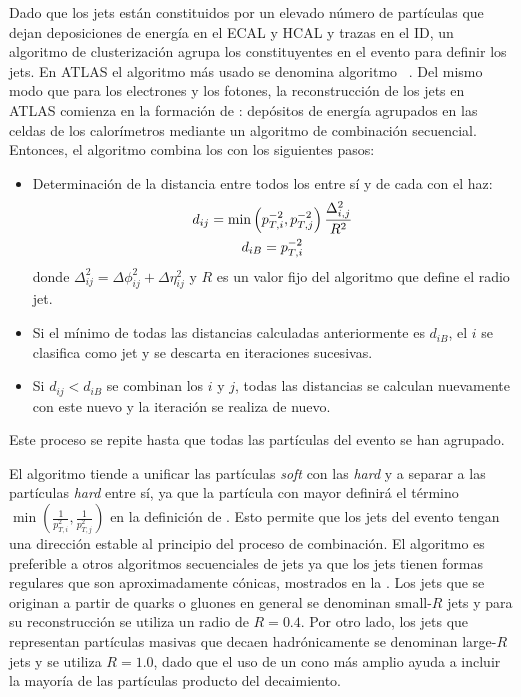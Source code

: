 Dado que los jets están constituidos por un elevado número de partículas que dejan deposiciones de energía en el \ac{ECAL} y \ac{HCAL} y trazas en el \ac{ID}, un algoritmo de clusterización agrupa los constituyentes en el evento para definir los jets. En \ac{ATLAS} el algoritmo más usado se denomina algoritmo \antikt~\cite{AntiKtAlgorithm}. Del mismo modo que para los electrones y los fotones, la reconstrucción de los jets en \ac{ATLAS} comienza en la formación de \topos: depósitos de energía agrupados en las celdas de los calorímetros mediante un algoritmo de combinación secuencial. Entonces, el algoritmo \antikt combina los \topos con los siguientes pasos:
\begin{itemize}
    \item Determinación de la distancia entre todos los \topos entre sí y de cada \topo con el haz:
        \begin{gather}
            d_{ij} = \min \left( p_{T,i}^{-2}, p_{T,j}^{-2} \right) \frac{\Delta_{i,j}^2}{R^2}\\
            d_{iB} = p_{T,i}^{-2}
        \end{gather}
        donde \(\Delta_{ij}^2 = \Delta\phi_{ij}^2 + \Delta\eta_{ij}^2\) y \(R\) es un valor fijo del algoritmo que define el radio jet.
    \item Si el mínimo de todas las distancias calculadas anteriormente es \(d_{iB}\), el \topo \(i\) se clasifica como jet y se descarta en iteraciones sucesivas.
    \item Si \(d_{ij} < d_{iB}\) se combinan los \topos \(i\) y \(j\), todas las distancias se calculan nuevamente con este nuevo \topo y la iteración se realiza de nuevo.
\end{itemize}
Este proceso se repite hasta que todas las partículas del evento se han agrupado.

El algoritmo \antikt tiende a unificar las partículas \textit{soft} con las \textit{hard} y a separar a las partículas \textit{hard} entre sí, ya que la partícula con mayor \pt definirá el término \(\min \left( \frac{1}{p_{T,i}^2}, \frac{1}{p_{T,j}^2}  \right)\) en la definición de \dij. Esto permite que los jets del evento tengan una dirección estable al principio del proceso de combinación. El algoritmo \antikt es preferible a otros algoritmos secuenciales de jets ya que los jets tienen formas regulares que son aproximadamente cónicas, mostrados en la \Fig{\ref{fig:objects:jets:antikt}}. Los jets que se originan a partir de quarks o gluones en general se denominan small-\(R\) jets y para su reconstrucción se utiliza un radio de \(R=0.4\). Por otro lado, los jets que representan partículas masivas que decaen hadrónicamente se denominan large-\(R\) jets y se utiliza \(R=1.0\), dado que el uso de un cono más amplio ayuda a incluir la mayoría de las partículas producto del decaimiento.


